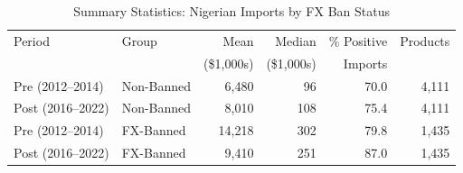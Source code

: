\begin{table}[htbp]
\centering
\caption{Summary Statistics: Nigerian Imports by FX Ban Status}
\label{tab:sumstats}
\begin{tabular}{llrrrr}
\toprule
Period & Group & Mean & Median & \% Positive & Products \\
 & & (\$1,000s) & (\$1,000s) & Imports & \\
\midrule
Pre (2012--2014) & Non-Banned & 6,480 & 96 & 70.0 & 4,111 \\
Post (2016--2022) & Non-Banned & 8,010 & 108 & 75.4 & 4,111 \\
Pre (2012--2014) & FX-Banned & 14,218 & 302 & 79.8 & 1,435 \\
Post (2016--2022) & FX-Banned & 9,410 & 251 & 87.0 & 1,435 \\
\bottomrule
\end{tabular}
\par{}
\end{table}
